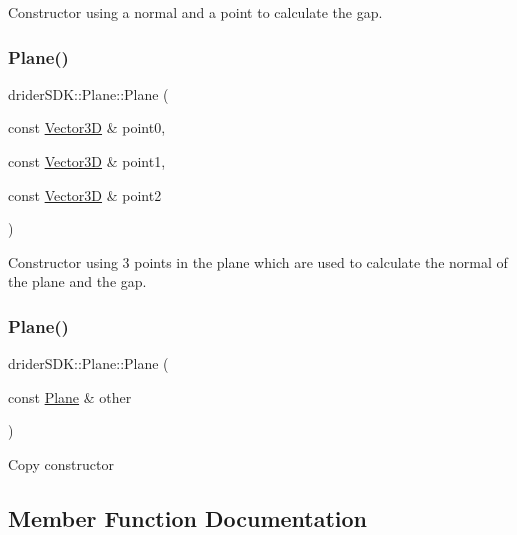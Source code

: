 Constructor using a normal and a point to calculate the gap. \mbox{\label{classdrider_s_d_k_1_1_plane_a4348d4b3f619cda528aa2512d6854538}} 
\subsubsection{\texorpdfstring{Plane()}{Plane()}\hspace{0.1cm}{\footnotesize\ttfamily [4/5]}}
{\footnotesize\ttfamily drider\+S\+D\+K\+::\+Plane\+::\+Plane (\begin{DoxyParamCaption}\item[{const \hyperlink{classdrider_s_d_k_1_1_vector3_d}{Vector3D} \&}]{point0,  }\item[{const \hyperlink{classdrider_s_d_k_1_1_vector3_d}{Vector3D} \&}]{point1,  }\item[{const \hyperlink{classdrider_s_d_k_1_1_vector3_d}{Vector3D} \&}]{point2 }\end{DoxyParamCaption})}

Constructor using 3 points in the plane which are used to calculate the normal of the plane and the gap. \mbox{\label{classdrider_s_d_k_1_1_plane_a8252aebcd126e8fe5b904513db658575}} 
\subsubsection{\texorpdfstring{Plane()}{Plane()}\hspace{0.1cm}{\footnotesize\ttfamily [5/5]}}
{\footnotesize\ttfamily drider\+S\+D\+K\+::\+Plane\+::\+Plane (\begin{DoxyParamCaption}\item[{const \hyperlink{classdrider_s_d_k_1_1_plane}{Plane} \&}]{other }\end{DoxyParamCaption})}

Copy constructor 

\subsection{Member Function Documentation}
\mbox{\label{classdrider_s_d_k_1_1_plane_a1dbd209dd564674cc1a4065fd089e3b2}} 
